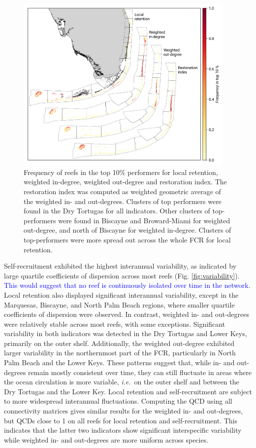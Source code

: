 \documentclass[preprint,12pt,authoryear]{elsarticle}
\newcommand{\modif}[1]{\textcolor{blue}{#1}}
\newcommand{\ie}{{\it i.e.}\ }
\begin{document}
	\begin{figure}
		\centering
		\includegraphics[width=0.95\textwidth]{figures/fig_top10.png}
		\caption{Frequency of reefs in the top 10\% performers for local retention, weighted in-degree, weighted out-degree and restoration index. The restoration index was computed as weighted geometric average of the weighted in- and out-degrees. Clusters of top performers were found in the Dry Tortugas for all indicators. Other clusters of top-performers were found in Biscayne and Broward-Miami for weighted out-degree, and north of Biscayne for weighted in-degree. Clusters of top-performers were more spread out across the whole FCR for local retention.}\label{fig:top10}
	\end{figure}
	
	Self-recruitment exhibited the highest interannual variability, as indicated by large quartile coefficients of dispersion across most reefs (Fig. \ref{fig:variability}). \modif{This would suggest that no reef is continuously isolated over time in the network}. Local retention also displayed significant interannual variability, except in the Marquesas, Biscayne, and North Palm Beach regions, where smaller quartile coefficients of dispersion were observed. In contrast, weighted in- and out-degrees were relatively stable across most reefs, with some exceptions. Significant variability in both indicators was detected in the Dry Tortugas and Lower Keys, primarily on the outer shelf. Additionally, the weighted out-degree exhibited larger variability in the northernmost part of the FCR, particularly in North Palm Beach and the Lower Keys. These patterns suggest that, while in- and out-degrees remain mostly consistent over time, they can still fluctuate in areas where the ocean circulation is more variable, \ie on the outer shelf and between the Dry Tortugas and the Lower Key. Local retention and self-recruitment are subject to more widespread interannual fluctuations. Computing the QCD using all connectivity matrices gives similar results for the weighted in- and out-degrees, but QCDs close to 1 on all reefs for local retention and self-recruitment. This indicates that the latter two indicators show significant interspecific variability while weighted in- and out-degrees are more uniform across species.
	
\end{document}
